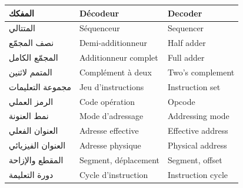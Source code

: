 \begin{center}
\begin{tabular}{|l|l|l|}
    المفكك & \textenglish{Décodeur} & \textenglish{Decoder} \\ \hline
    المتتالي & \textenglish{Séquenceur} & \textenglish{Sequencer} \\ \hline
    نصف المجمّع & \textenglish{Demi-additionneur} & \textenglish{Half adder} \\ \hline
    المجمّع الكامل & \textenglish{Additionneur complet} & \textenglish{Full adder} \\ \hline
    المتمم لاثنين & \textenglish{Complément à deux} & \textenglish{Two's complement} \\ \hline
    مجموعة التعليمات & \textenglish{Jeu d'instructions} & \textenglish{Instruction set} \\ \hline
    الرمز العملي & \textenglish{Code opération} & \textenglish{Opcode} \\ \hline
    نمط العنونة & \textenglish{Mode d'adressage} & \textenglish{Addressing mode} \\ \hline
    العنوان الفعلي & \textenglish{Adresse effective} & \textenglish{Effective address} \\ \hline
    العنوان الفيزيائي & \textenglish{Adresse physique} & \textenglish{Physical address} \\ \hline
    المقطع والإزاحة & \textenglish{Segment, déplacement} & \textenglish{Segment, offset} \\ \hline
    دورة التعليمة & \textenglish{Cycle d'instruction} & \textenglish{Instruction cycle} \\ \hline
\end{tabular}
\end{center}

